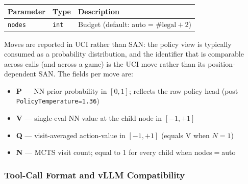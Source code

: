 \begin{tcolorbox}[toolbox, title={\texttt{get\_policy(nodes: int = auto)}}]

\smallskip
\begin{tabular}{@{}lll@{}}
  \toprule
  \textbf{Parameter} & \textbf{Type} & \textbf{Description} \\
  \midrule
  \texttt{nodes} & \texttt{int} & Budget (default: auto = \(\#\text{legal}+2\)) \\
  \bottomrule
\end{tabular}

\smallskip
{}

\smallskip
\noindent Moves are reported in UCI rather than SAN: the policy view is
typically consumed as a probability distribution, and the identifier
that is comparable across calls (and across a game) is the UCI move
rather than its position-dependent SAN.  The fields per move are:
\begin{itemize}[noitemsep, topsep=2pt, leftmargin=14pt]
  \item \textbf{P} — NN prior probability in $[0,1]$; reflects the raw policy head (post \texttt{PolicyTemperature=1.36})
  \item \textbf{V} — single-eval NN value at the child node in $[-1,+1]$
  \item \textbf{Q} — visit-averaged action-value in $[-1,+1]$ (equals V when $N{=}1$)
  \item \textbf{N} — MCTS visit count; equal to 1 for every child when nodes$=$auto
\end{itemize}
\end{tcolorbox}

\subsubsection{Tool-Call Format and vLLM Compatibility}
\label{app:details:agent:format}


